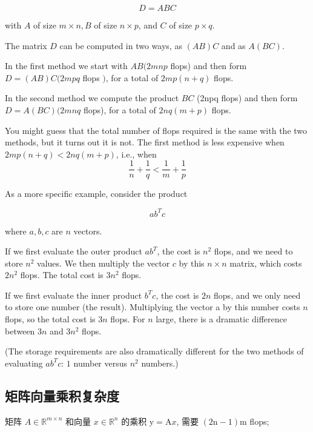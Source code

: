 $$ D=A B C $$

with $ A $ of size $ m \times n, B $ of size $ n \times p $, and $ C $ of size $ p \times q $. 

The matrix $ D $ can be computed in two ways, as $ (A B) C $ and as $ A(B C) $. 

In the first method we start with $ A B(2 m n p $ flops) and then form $ D=(A B) C(2 m p q $ flops $ ) $, for a total of $ 2 m p(n+q) $ flops. 

In the second method we compute the product $ B C $ (2npq flops) and then form $ D=A(B C)(2 m n q $ flops), for a total of $ 2 n q(m+p) $ flops.

\begin{remark}
    You might guess that the total number of flops required is the same with the two methods, but it turns out it is not. The first method is less expensive when $ 2 m p(n+q)<2 n q(m+p) $, i.e., when
$$
\frac{1}{n}+\frac{1}{q}<\frac{1}{m}+\frac{1}{p}
$$
\end{remark}

\begin{example}
    As a more specific example, consider the product 
    
    $$ a b^{T} c $$
    
    where $ a, b, c $ are $ n $ vectors. 
    
    If we first evaluate the outer product $ a b^{T} $, the cost is $ n^{2} $ flops, and we need to store $ n^{2} $ values. We then multiply the vector $ c $ by this $ n \times n $ matrix, which costs $ 2 n^{2} $ flops. The total cost is $ 3 n^{2} $ flops.

    If we first evaluate the inner product $b^Tc$, the cost is $2n$ flops, and we only need to store one number (the result). Multiplying the vector a by this number costs $n$ flops, so the total cost is $3n$ flops. For $n$ large, there is a dramatic difference between $3n$ and $3n^2$ flops.

    (The storage requirements are also dramatically different for the two methods of evaluating $ab^Tc$: $1$ number versus $n^2$ numbers.)
\end{example}

\subsection{矩阵向量乘积复杂度}

矩阵 $ A \in \mathbb{R}^{m \times n} $ 和向量 $ x \in \mathbb{R}^{n} $ 的乘积 $ \mathrm{y}=\mathrm{A} x $, 需要 $ (2 \mathrm{n}-1) \mathrm{m} $ flops;

